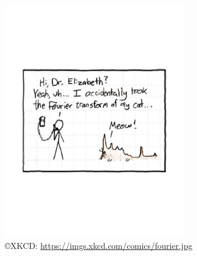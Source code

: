 \documentclass{article}
\begin{document}
\endofhomework

	\begin{center}
	\includegraphics[width = 0.6\textwidth]{89-PS9-FourierComic}\\
	\copyright XKCD:  \url{https://imgs.xkcd.com/comics/fourier.jpg}
	\end{center}
	
	
\addfooter
\end{document}
